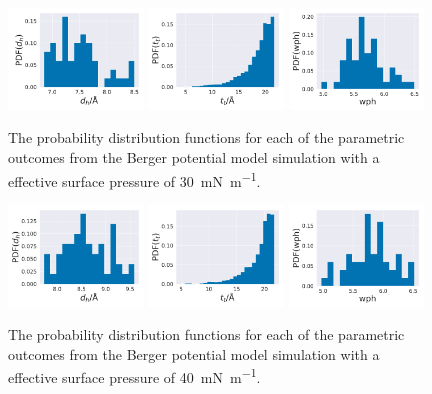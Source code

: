 \documentclass[amsmath,amssymb,superscriptaddress]{revtex4-1}
\begin{document}
%
%
\begin{figure}
 \centering
 \includegraphics[width=0.32\textwidth]{berger_30_dh}
 \includegraphics[width=0.32\textwidth]{berger_30_tt}
 \includegraphics[width=0.32\textwidth]{berger_30_wph}
 \caption{The probability distribution functions for each of the parametric outcomes from the Berger potential model simulation with a effective surface pressure of \SI{30}{\milli\newton\per\meter}.}
 \label{fig:be30}
\end{figure}
%
%
\begin{figure}
 \centering
 \includegraphics[width=0.32\textwidth]{berger_40_dh}
 \includegraphics[width=0.32\textwidth]{berger_40_tt}
 \includegraphics[width=0.32\textwidth]{berger_40_wph}
 \caption{The probability distribution functions for each of the parametric outcomes from the Berger potential model simulation with a effective surface pressure of \SI{40}{\milli\newton\per\meter}.}
 \label{fig:be40}
\end{figure}
\end{document}
